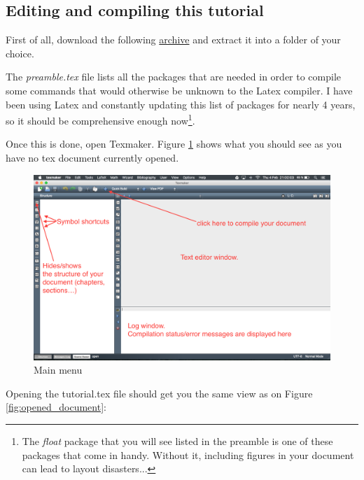 \documentclass{report}
\begin{document}
\subsection*{Editing and compiling this tutorial}

First of all, download the following \href{https://drive.google.com/file/d/0Bzf79yzZcPJJNVhKNFBxWGs1aEE/view?usp=sharing}{archive} and extract it into a folder of your choice.

The \textit{preamble.tex} file lists all the packages that are needed in order to compile some commands that would otherwise be unknown to the Latex compiler. I have been using Latex and constantly updating this list of packages for nearly 4 years, so it should be comprehensive enough now\footnote{The \textit{float} package that you will see listed in the preamble is one of these packages that come in handy. Without it, including figures in your document can lead to layout disasters... }.

Once this is done, open Texmaker. Figure \ref{fig:texmaker_menu} shows what you should see as you have no tex document currently opened.

\begin{figure}[H]
\centering
\includegraphics[scale=0.38]{texmaker_menu}
\caption{Main menu}
\label{fig:texmaker_menu}
\end{figure}

Opening the tutorial.tex file should get you the same view as on Figure \ref{fig:opened_document}:
\end{document}
